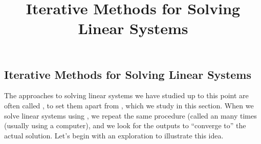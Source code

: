 \documentclass{ximera}
\title{Iterative Methods for Solving Linear Systems} \license{CC BY-NC-SA 4.0}
\begin{document}
\begin{abstract}

\end{abstract}
\maketitle

\begin{onlineOnly}
\section*{Iterative Methods for Solving Linear Systems}
\end{onlineOnly}

The approaches to solving linear systems we have studied up to this point are often called , to set them apart from , which we study in this section.  When we solve linear systems using , we repeat the same procedure (called an  many times (usually using a computer), and we look for the outputs to ``converge to'' the actual solution.  Let's begin with an exploration to illustrate this idea.
\end{document}
